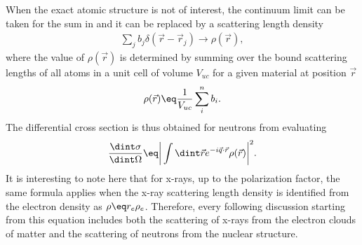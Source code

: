 \documentclass[\main/dresen_thesis.tex]{subfiles}
\begin{document}
When the exact atomic structure is not of interest, the continuum limit can be taken for the sum in  and it can be replaced by a scattering length density
\begin{align}
  \sum_j b_j \delta(\vec{r} - \vec{r}_j) \rightarrow \rho(\vec{r}),
\end{align}
where the value of $\rho(\vec{r})$ is determined by summing over the bound scattering lengths of all atoms in a unit cell of volume $V_{uc}$ for a given material at position $\vec{r}$
\begin{align}
  \rho(\vec{r}) \eq \frac{1}{V_{uc}} \sum_i^n b_i.
\end{align}
The differential cross section is thus obtained for neutrons from evaluating
\begin{align}
  \frac{\dint \sigma}{\dint \Omega} \eq \bigg| \int \dint \vec{r} e^{-i\vec{q} \cdot \vec{r}} \rho (\vec{r}) \bigg|^2.
  \label{eq:theoreticalBackground:scattering:scatteringTheory:differentialCrossSectionBornApproximation}
\end{align}
It is interesting to note here that for x-rays, up to the polarization factor, the same formula applies when the x-ray scattering length density is identified from the electron density as $\rho \eq r_e \rho_e$.
Therefore, every following discussion starting from this equation includes both the scattering of x-rays from the electron clouds of matter and the scattering of neutrons from the nuclear structure.
\end{document}
